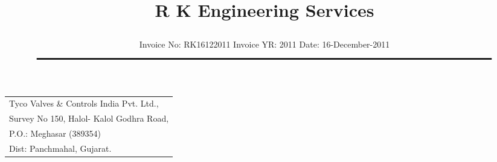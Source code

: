 \documentclass[11pt]{article}
\title{\vspace*{-1.5cm} \centerline{ \Huge \bf \hspace{0cm} R K Engineering Services}\vspace*{-0.75cm}}
\author{%
 \scriptsize Invoice No: RK16122011  \hspace*{4cm}  Invoice YR: 2011 \hspace*{4cm} Date: 16-December-2011\\
$\rule{7.5in}{0.5mm}$}
\date{}
\begin{document}
\maketitle
\thispagestyle{empty}
\vspace*{0.5cm}	
\begin{flushleft}
{\footnotesize
\begin{tabular}{l}
Tyco Valves \& Controls India Pvt. Ltd.,\\
Survey No 150, Halol- Kalol Godhra Road,\\
P.O.:  Meghasar (389354)\\
Dist: Panchmahal, Gujarat.\\
\end{tabular}
}
\end{flushleft}

\vspace*{1cm}

\vspace*{0.5cm}

\end{document}
